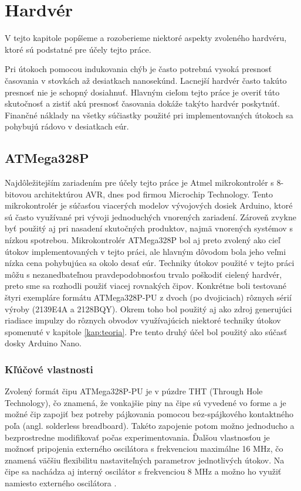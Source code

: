 \chapter{Hardvér}
\label{kap:hardver}

V tejto kapitole popíšeme a rozoberieme niektoré aspekty zvoleného hardvéru, ktoré sú podstatné pre účely tejto práce.

Pri útokoch pomocou indukovania chýb je často potrebná vysoká presnosť časovania v stovkách až desiatkach nanosekúnd. Lacnejší hardvér často takúto presnosť nie je schopný dosiahnuť. Hlavným cieľom tejto práce je overiť túto skutočnosť a zistiť akú presnosť časovania dokáže takýto hardvér poskytnúť. Finančné náklady na všetky súčiastky použité pri implementovaných útokoch sa pohybujú rádovo v desiatkach eúr.

\section{ATMega328P} \label{kap2:sek:ATMega328P}
Najdôležitejším zariadením pre účely tejto práce je Atmel mikrokontrolér s 8-bitovou architektúrou AVR, dnes pod firmou Microchip Technology. Tento mikrokontrolér je súčasťou viacerých modelov vývojových dosiek Arduino, ktoré sú často využívané pri vývoji jednoduchých vnorených zariadení. Zároveň zvykne byť použitý aj pri nasadení skutočných produktov, najmä vnorených systémov s nízkou spotrebou. Mikrokontrolér ATMega328P bol aj preto zvolený ako cieľ útokov implementovaných v tejto práci, ale hlavným dôvodom bola jeho veľmi nízka cena pohybujúca sa okolo desať eúr. Techniky útokov použité v tejto práci môžu s nezanedbateľnou pravdepodobnosťou trvalo poškodiť cielený hardvér, preto sme sa rozhodli použiť viacej rovnakých čipov. Konkrétne boli testované štyri exempláre formátu ATMega328P-PU z dvoch (po dvojiciach) rôznych sérií výroby (2139E4A a 2128BQY). Okrem toho bol použitý aj ako zdroj generujúci riadiace impulzy do rôznych obvodov využívajúcich niektoré techniky útokov spomenuté v kapitole \ref{kap:teoria}. Pre tento druhý účel bol použitý ako súčasť dosky Arduino Nano.

\subsection{Kľúčové vlastnosti}
Zvolený formát čipu ATMega328P-PU je v púzdre THT (Through Hole Technology), čo znamená, že vonkajšie piny na čipe sú vyvedené vo forme  a je možné čip zapojiť bez potreby pájkovania pomocou bez-spájkového kontaktného poľa (angl. solderless breadboard). Takéto zapojenie potom možno jednoducho a bezprostredne modifikovať počas experimentovania. Ďalšou vlastnosťou je možnosť pripojenia externého oscilátora s frekvenciou maximálne 16 MHz, čo znamená väčšiu flexibilitu nastaviteľných parametrov jednotlivých útokov. Na čipe sa nachádza aj interný oscilátor s frekvenciou 8 MHz a možno ho využiť namiesto externého oscilátora \cite{atmegaData}.

